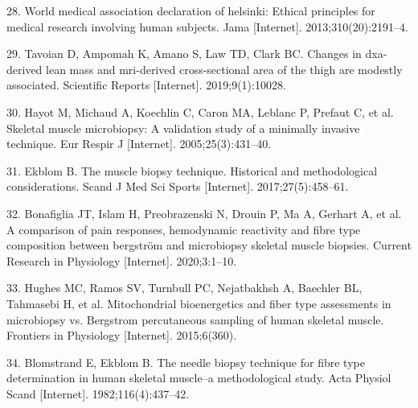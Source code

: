 \documentclass[twoside,10pt]{gihclass} %
\begin{document}
\leavevmode\hypertarget{ref-RN2548}{}%
28. World medical association declaration of helsinki: Ethical principles for medical research involving human subjects. Jama {[}Internet{]}. 2013;310(20):2191--4.

\leavevmode\hypertarget{ref-RN2541}{}%
29. Tavoian D, Ampomah K, Amano S, Law TD, Clark BC. Changes in dxa-derived lean mass and mri-derived cross-sectional area of the thigh are modestly associated. Scientific Reports {[}Internet{]}. 2019;9(1):10028.

\leavevmode\hypertarget{ref-RN824}{}%
30. Hayot M, Michaud A, Koechlin C, Caron MA, Leblanc P, Prefaut C, et al. Skeletal muscle microbiopsy: A validation study of a minimally invasive technique. Eur Respir J {[}Internet{]}. 2005;25(3):431--40.

\leavevmode\hypertarget{ref-RN2549}{}%
31. Ekblom B. The muscle biopsy technique. Historical and methodological considerations. Scand J Med Sci Sports {[}Internet{]}. 2017;27(5):458--61.

\leavevmode\hypertarget{ref-RN2553}{}%
32. Bonafiglia JT, Islam H, Preobrazenski N, Drouin P, Ma A, Gerhart A, et al. A comparison of pain responses, hemodynamic reactivity and fibre type composition between bergström and microbiopsy skeletal muscle biopsies. Current Research in Physiology {[}Internet{]}. 2020;3:1--10.

\leavevmode\hypertarget{ref-RN2552}{}%
33. Hughes MC, Ramos SV, Turnbull PC, Nejatbakhsh A, Baechler BL, Tahmasebi H, et al. Mitochondrial bioenergetics and fiber type assessments in microbiopsy vs. Bergstrom percutaneous sampling of human skeletal muscle. Frontiers in Physiology {[}Internet{]}. 2015;6(360).

\leavevmode\hypertarget{ref-RN874}{}%
34. Blomstrand E, Ekblom B. The needle biopsy technique for fibre type determination in human skeletal muscle--a methodological study. Acta Physiol Scand {[}Internet{]}. 1982;116(4):437--42.


\end{document}
